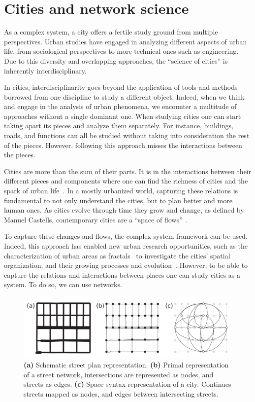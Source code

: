 \section{Cities and network science}


As a complex system, a city offers a fertile study ground from multiple perspectives. Urban studies have engaged in analyzing different aspects of urban life, from sociological perspectives to more technical ones such as engineering. Due to this diversity and overlapping approaches, the ``science of cities'' is inherently interdisciplinary.

In cities, interdisciplinarity goes beyond the application of tools and methods borrowed from one discipline to study a different object. Indeed, when we think and engage in the analysis of urban phenomena, we encounter a multitude of approaches without a single dominant one. When studying cities one can start taking apart its pieces and analyze them separately. For instance, buildings, roads, and functions can all be studied without taking into consideration the rest of the pieces. However, following this approach misses the interactions between the pieces. 

Cities are more than the sum of their parts. It is in the interactions between their different pieces and components where one can find the richness of cities and the spark of urban life~\cite{Jacobs1961Death}. In a mostly urbanized world, capturing these relations is fundamental to not only understand the cities, but to plan better and more human ones. As cities evolve through time they grow and change, as defined by Manuel Castells, contemporary cities are a ``space of flows''~\cite{castells1989informational}. 

To capture these changes and flows, the complex system framework can be used. Indeed, this approach has enabled new urban research opportunities, such as the characterization of urban areas as fractals~\cite{batty1996preliminary} to investigate the cities' spatial organization, and their growing processes and evolution~\cite{makse1995growth}. However, to be able to capture the relations and interactions between places one can study cities as a system. To do so, we can use networks.

\begin{figure}[th!]
	\centering
	\includegraphics[width=\textwidth]{images/introduction/networks.pdf}
	\caption[Network representation of a city]{\textbf{(a)} Schematic street plan representation. \textbf{(b)} Primal representation of a street network, intersections are represented as nodes, and streets as edges. \textbf{(c)} Space syntax representation of a city. Continues streets mapped as nodes, and edges between intersecting streets.}
	\label{fig:networks}
\end{figure}


